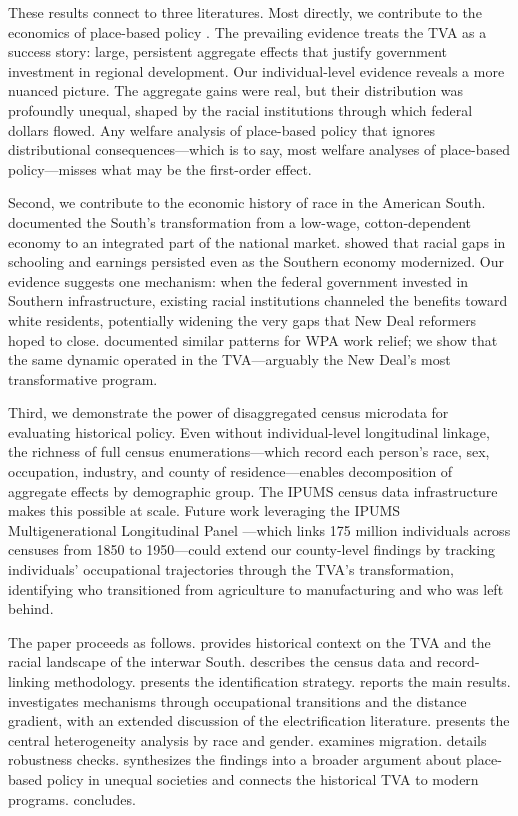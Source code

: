 \documentclass[12pt]{article}
\begin{document}
These results connect to three literatures. Most directly, we contribute to the economics of place-based policy \citep{glaeser2008, kline2013, neumark2015}. The prevailing evidence treats the TVA as a success story: large, persistent aggregate effects that justify government investment in regional development. Our individual-level evidence reveals a more nuanced picture. The aggregate gains were real, but their distribution was profoundly unequal, shaped by the racial institutions through which federal dollars flowed. Any welfare analysis of place-based policy that ignores distributional consequences---which is to say, most welfare analyses of place-based policy---misses what may be the first-order effect.

Second, we contribute to the economic history of race in the American South. \citet{wright1986} documented the South's transformation from a low-wage, cotton-dependent economy to an integrated part of the national market. \citet{margo1990} showed that racial gaps in schooling and earnings persisted even as the Southern economy modernized. Our evidence suggests one mechanism: when the federal government invested in Southern infrastructure, existing racial institutions channeled the benefits toward white residents, potentially widening the very gaps that New Deal reformers hoped to close. \citet{fishback2024} documented similar patterns for WPA work relief; we show that the same dynamic operated in the TVA---arguably the New Deal's most transformative program.

Third, we demonstrate the power of disaggregated census microdata for evaluating historical policy. Even without individual-level longitudinal linkage, the richness of full census enumerations---which record each person's race, sex, occupation, industry, and county of residence---enables decomposition of aggregate effects by demographic group. The IPUMS census data infrastructure \citep{ruggles2024} makes this possible at scale. Future work leveraging the IPUMS Multigenerational Longitudinal Panel \citep{ipumsmlp2025}---which links 175 million individuals across censuses from 1850 to 1950---could extend our county-level findings by tracking individuals' occupational trajectories through the TVA's transformation, identifying who transitioned from agriculture to manufacturing and who was left behind.

The paper proceeds as follows.  provides historical context on the TVA and the racial landscape of the interwar South.  describes the census data and record-linking methodology.  presents the identification strategy.  reports the main results.  investigates mechanisms through occupational transitions and the distance gradient, with an extended discussion of the electrification literature.  presents the central heterogeneity analysis by race and gender.  examines migration.  details robustness checks.  synthesizes the findings into a broader argument about place-based policy in unequal societies and connects the historical TVA to modern programs.  concludes.
\end{document}
